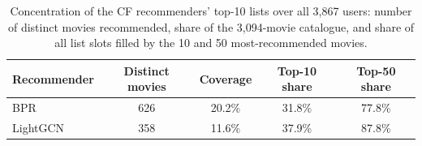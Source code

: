 \begin{table}[t]
\centering\small
\caption{Concentration of the CF recommenders' top-10 lists over all 3,867 users: number of distinct movies recommended, share of the 3,094-movie catalogue, and share of all list slots filled by the 10 and 50 most-recommended movies.}
\label{tab:concentration}
\begin{tabular}{lcccc}
\toprule
Recommender & Distinct movies & Coverage & Top-10 share & Top-50 share \\
\midrule
BPR & 626 & 20.2\% & 31.8\% & 77.8\% \\
LightGCN & 358 & 11.6\% & 37.9\% & 87.8\% \\
\bottomrule
\end{tabular}
\end{table}
